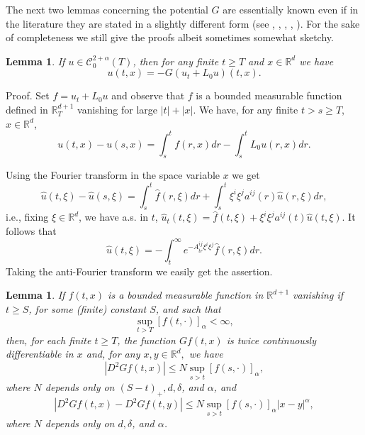 \documentclass[reqno,12pt]{amsart}
\newtheorem{lemma}[theorem]{Lemma}
\theoremstyle{definition}
\theoremstyle{remark}
\begin{document}
   The next  two lemmas
    concerning the potential $G$ are
essentially known even if in the literature they are stated in
    a slightly different form (see \cite{B}, \cite{Kn}, \cite{Kry2},
\cite{L}, \cite{Lo}). For the sake of completeness we
   still give   the  proofs albeit sometimes somewhat
   sketchy.

\begin{lemma}
                                         \label{lemma 4.24.1}
If $u\in{\mathcal{C}}^{2+\alpha}_{0}(T)$, then for any  finite $t\geq T$ and
$x\in{\mathbb{R}}^{d}$ we have
\begin{equation}
                                                  \label{4.24.1}
u(t,x)=-G (  u_{t}+L_{0}u)(t,x).
\end{equation}

\end{lemma}

Proof. Set $f = u_t + L_0 u $ and observe that
   $f$ is a bounded
measurable function defined in ${\mathbb{R}}^{d+1}_{T}$ 
vanishing for large $|t|+|x|$. We
have, for any finite $t>s\geq T$, $x \in {\mathbb{R}}^d$,
$$
u(t,x) - u(s,x) = \int_s^t f(r,x)dr - \int_s^t L_0 u(r, x) dr.
$$

 Using the Fourier transform in the space variable $x$ we get
$$
\hat u(t,\xi) - \hat u(s,\xi) = \int_s^t \hat f(r,\xi)dr +
\int_s^t \xi^i \xi^j a^{ij}(r) \hat u(r, \xi) dr,
$$
i.e., fixing $\xi \in {\mathbb{R}}^d$, we have a.s. in $t$, $\hat u_t(t,
\xi) = \hat f (t, \xi) + \xi^i \xi^j a^{ij}(t) \hat u(t, \xi)$. It
follows that
$$
\hat u (t, \xi) = - \int_t^{ \infty} e^{- {A^{ij}_{tr}\xi^i \xi^j
}} \hat f (r, \xi) dr.
$$
Taking the anti-Fourier transform we easily get the assertion.  
\begin{lemma}
                                         \label{lemma 4.24.2}
If $f(t,x)$ is a bounded  measurable function in ${\mathbb{R}}^{d+1}$
vanishing if $t\geq S$, for some 
(finite) constant $S$, and such that
\begin{equation}
                                                  \label{4.13.2}
\sup_{t>T}[f(t,\cdot)]_{\alpha}<\infty,
\end{equation}
then, for each finite $t\geq T$, the function $Gf(t,x)$ is twice
continuously differentiable in $x$ and, for any $x,y\in{\mathbb{R}}^{d},$
   we have
\begin{equation}
                                                  \label{4.13.1}
|D^{2}G f(t,x) |\leq N  \sup_{s>t}[f(s,\cdot)]_{\alpha},
\end{equation}
where $N$ depends only on $(S-t)_{+},d,\delta$, and $\alpha$, and
\begin{equation}
                                                  \label{4.24.01}
|D^{2}G f(t,x)-D^{2}G f(t,y)|\leq N
   \sup_{s>t} [f(s,\cdot)]_{\alpha}|x-y|^{\alpha},
\end{equation}
where $N$ depends only on $d,\delta$, and $\alpha$.
\end{lemma}
\end{document}
